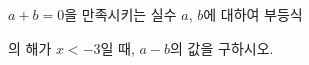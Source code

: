 $a+b=0$을 만족시키는 실수 $a$, $b$에 대하여 부등식\par\smallskip{}\par\smallskip\noindent 의 해가 $x<-3$일 때, $a-b$의 값을 구하시오.
